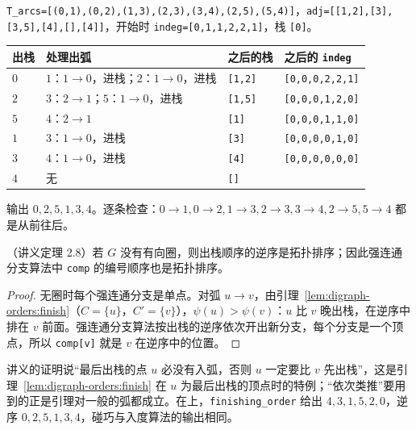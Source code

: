 \begin{example}\label{ex:digraph-orders:kahn}
\texttt{T\_arcs=[(0,1),(0,2),(1,3),(2,3),(3,4),(2,5),(5,4)]}，\texttt{adj=[[1,2],[3],[3,5],[4],[],[4]]}，开始时 \texttt{indeg=[0,1,1,2,2,1]}，栈 \texttt{[0]}。
\begin{center}
\small
\begin{tabular}{llll}
\toprule
出栈 & 处理出弧 & 之后的栈 & 之后的 \texttt{indeg} \\
\midrule
$0$ & $1$：$1\to0$，进栈；$2$：$1\to0$，进栈 & \texttt{[1,2]} & \texttt{[0,0,0,2,2,1]} \\
$2$ & $3$：$2\to1$；$5$：$1\to0$，进栈 & \texttt{[1,5]} & \texttt{[0,0,0,1,2,0]} \\
$5$ & $4$：$2\to1$ & \texttt{[1]} & \texttt{[0,0,0,1,1,0]} \\
$1$ & $3$：$1\to0$，进栈 & \texttt{[3]} & \texttt{[0,0,0,0,1,0]} \\
$3$ & $4$：$1\to0$，进栈 & \texttt{[4]} & \texttt{[0,0,0,0,0,0]} \\
$4$ & 无 & \texttt{[]} & \\
\bottomrule
\end{tabular}
\end{center}
输出 $0,2,5,1,3,4$。逐条检查：$0\to1,0\to2,1\to3,2\to3,3\to4,2\to5,5\to4$ 都是从前往后。
\end{example}


\begin{theorem}\label{thm:digraph-orders:dfs-topo}
（讲义定理 2.8）若 $G$ 没有有向圈，则出栈顺序的逆序是拓扑排序；因此强连通分支算法中 \texttt{comp} 的编号顺序也是拓扑排序。
\end{theorem}
\begin{proof}
无圈时每个强连通分支是单点。对弧 $u\to v$，由引理~\ref{lem:digraph-orders:finish}（$C=\{u\}$，$C'=\{v\}$），$\psi(u)>\psi(v)$：$u$ 比 $v$ 晚出栈，在逆序中排在 $v$ 前面。强连通分支算法按出栈的逆序依次开出新分支，每个分支是一个顶点，所以 \texttt{comp[v]} 就是 $v$ 在逆序中的位置。
\end{proof}

讲义的证明说“最后出栈的点 $u$ 必没有入弧，否则 $u$ 一定要比 $v$ 先出栈”，这是引理~\ref{lem:digraph-orders:finish} 在 $u$ 为最后出栈的顶点时的特例；“依次类推”要用到的正是引理对一般的弧都成立。在上，\texttt{finishing\_order} 给出 $4,3,1,5,2,0$，逆序 $0,2,5,1,3,4$，碰巧与入度算法的输出相同。



